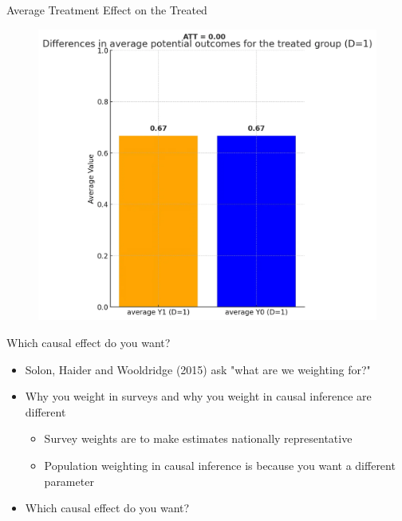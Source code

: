 \documentclass{beamer}
\begin{document}
\begin{frame}{Average Treatment Effect on the Treated}

\begin{figure}
    \centering
    \includegraphics[height=0.8\textheight]{./lecture_includes/step1_att}
\end{figure}


\end{frame}



\begin{frame}{Which causal effect do you want?}

\begin{itemize}
\item Solon, Haider and Wooldridge (2015) ask "what are we weighting for?"
\item Why you weight in surveys and why you weight in causal inference are different
	\begin{itemize}
	\item Survey weights are to make estimates nationally representative
	\item Population weighting in causal inference is because you want a different parameter
	\end{itemize}
\item Which causal effect do you want?
\end{itemize}

\end{frame}
\end{document}
